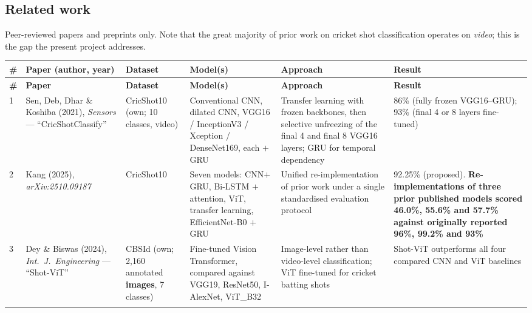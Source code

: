 \documentclass[11pt,a4paper]{article}
\renewcommand{\arraystretch}{1.25}
\begin{document}
\clearpage
\begin{landscape}
\section{Related work}

Peer-reviewed papers and preprints only. Note that the great majority of prior work on
cricket shot classification operates on \emph{video}; this is the gap the present project
addresses.

\footnotesize
\setlength{\LTleft}{\fill}
\setlength{\LTright}{\fill}
\renewcommand{\arraystretch}{1.15}
\begin{longtable}{@{}p{0.5cm}p{3.7cm}p{3.0cm}p{3.7cm}p{5.8cm}p{5.0cm}@{}}
\toprule
\textbf{\#} & \textbf{Paper (author, year)} & \textbf{Dataset} & \textbf{Model(s)} & \textbf{Approach} & \textbf{Result} \\
\midrule
\endfirsthead
\toprule
\textbf{\#} & \textbf{Paper} & \textbf{Dataset} & \textbf{Model(s)} & \textbf{Approach} & \textbf{Result} \\
\midrule
\endhead
\bottomrule
\endfoot

1 & Sen, Deb, Dhar \& Koshiba (2021), \textit{Sensors} --- ``CricShotClassify''~\cite{sen2021}
  & CricShot10 (own; 10 classes, video)
  & Conventional CNN, dilated CNN, VGG16 / InceptionV3 / Xception / DenseNet169, each $+$ GRU
  & Transfer learning with frozen backbones, then selective unfreezing of the final 4 and final 8 VGG16 layers; GRU for temporal dependency
  & 86\% (fully frozen VGG16--GRU); 93\% (final 4 or 8 layers fine-tuned) \\
\addlinespace

2 & Kang (2025), \textit{arXiv:2510.09187}~\cite{kang2025}
  & CricShot10
  & Seven models: CNN$+$GRU, Bi-LSTM $+$ attention, ViT, transfer learning, EfficientNet-B0 $+$ GRU
  & Unified re-implementation of prior work under a single standardised evaluation protocol
  & 92.25\% (proposed). \textbf{Re-implementations of three prior published models scored 46.0\%, 55.6\% and 57.7\% against originally reported 96\%, 99.2\% and 93\%} \\
\addlinespace

3 & Dey \& Biswas (2024), \textit{Int.\ J.\ Engineering} --- ``Shot-ViT''~\cite{dey2024}
  & CBSId (own; 2{,}160 annotated \textbf{images}, 7 classes)
  & Fine-tuned Vision Transformer, compared against VGG19, ResNet50, I-AlexNet, ViT\_B32
  & Image-level rather than video-level classification; ViT fine-tuned for cricket batting shots
  & Shot-ViT outperforms all four compared CNN and ViT baselines \\
\addlinespace


\end{longtable}
\end{landscape}
\end{document}
